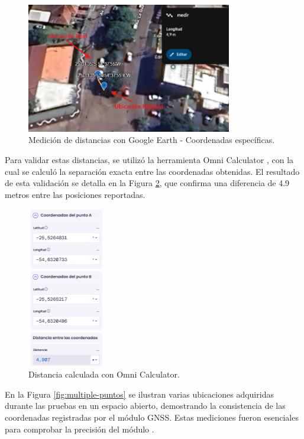 \begin{figure}[H]
    \centering
    \includegraphics[width=0.8\textwidth]{./capitulo_05/imagen/googleearth.png}
    \caption{Medición de distancias con Google Earth - Coordenadas específicas.}
    \label{fig:google-earth}
\end{figure}



Para validar estas distancias, se utilizó la herramienta Omni Calculator \cite{omnicalculator2024}, con la cual se calculó la separación exacta entre las coordenadas obtenidas. El resultado de esta validación se detalla en la Figura \ref{fig:omni-calculator}, que confirma una diferencia de 4.9 metros entre las posiciones reportadas.


\begin{figure}[H]
    \centering
    \includegraphics[width=0.3\textwidth]{./capitulo_05/imagen/calculad.png}
    \caption{Distancia calculada con Omni Calculator.}
    \label{fig:omni-calculator}
\end{figure}

En la Figura \ref{fig:multiple-puntos} se ilustran varias ubicaciones adquiridas durante las pruebas en un espacio abierto, demostrando la consistencia de las coordenadas registradas por el módulo GNSS. Estas mediciones fueron esenciales para comprobar la precisión del módulo .



